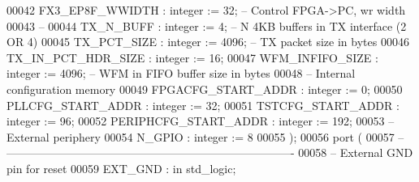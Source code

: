\begin{DoxyCode}
00042       \textcolor{vhdlchar}{FX3_EP8F_WWIDTH}         \textcolor{vhdlchar}{:} \textcolor{comment}{integer} \textcolor{vhdlchar}{:=} \textcolor{vhdllogic}{}\textcolor{vhdllogic}{32};\textcolor{keyword}{     -- Control FPGA->PC, wr width}
00043 \textcolor{keyword}{      -- }
00044       \textcolor{vhdlchar}{TX_N_BUFF}               \textcolor{vhdlchar}{:} \textcolor{comment}{integer} \textcolor{vhdlchar}{:=} \textcolor{vhdllogic}{}\textcolor{vhdllogic}{4};\textcolor{keyword}{      -- N 4KB buffers in TX interface (2 OR 4)}
00045       \textcolor{vhdlchar}{TX_PCT_SIZE}             \textcolor{vhdlchar}{:} \textcolor{comment}{integer} \textcolor{vhdlchar}{:=} \textcolor{vhdllogic}{}\textcolor{vhdllogic}{4096};\textcolor{keyword}{   -- TX packet size in bytes}
00046       \textcolor{vhdlchar}{TX_IN_PCT_HDR_SIZE}      \textcolor{vhdlchar}{:} \textcolor{comment}{integer} \textcolor{vhdlchar}{:=} \textcolor{vhdllogic}{}\textcolor{vhdllogic}{16};
00047       \textcolor{vhdlchar}{WFM_INFIFO_SIZE}         \textcolor{vhdlchar}{:} \textcolor{comment}{integer} \textcolor{vhdlchar}{:=} \textcolor{vhdllogic}{}\textcolor{vhdllogic}{4096};\textcolor{keyword}{   -- WFM in FIFO buffer size in bytes }
00048 \textcolor{keyword}{      -- Internal configuration memory }
00049       \textcolor{vhdlchar}{FPGACFG_START_ADDR}      \textcolor{vhdlchar}{:} \textcolor{comment}{integer} \textcolor{vhdlchar}{:=} \textcolor{vhdllogic}{}\textcolor{vhdllogic}{0};
00050       \textcolor{vhdlchar}{PLLCFG_START_ADDR}       \textcolor{vhdlchar}{:} \textcolor{comment}{integer} \textcolor{vhdlchar}{:=} \textcolor{vhdllogic}{}\textcolor{vhdllogic}{32};
00051       \textcolor{vhdlchar}{TSTCFG_START_ADDR}       \textcolor{vhdlchar}{:} \textcolor{comment}{integer} \textcolor{vhdlchar}{:=} \textcolor{vhdllogic}{}\textcolor{vhdllogic}{96};
00052       \textcolor{vhdlchar}{PERIPHCFG_START_ADDR}    \textcolor{vhdlchar}{:} \textcolor{comment}{integer} \textcolor{vhdlchar}{:=} \textcolor{vhdllogic}{}\textcolor{vhdllogic}{192};
00053 \textcolor{keyword}{      -- External periphery}
00054       \textcolor{vhdlchar}{N_GPIO}                  \textcolor{vhdlchar}{:} \textcolor{comment}{integer} \textcolor{vhdlchar}{:=} \textcolor{vhdllogic}{}\textcolor{vhdllogic}{8}
00055    \textcolor{vhdlchar}{)};
00056    \textcolor{keywordflow}{port} \textcolor{vhdlchar}{(}
00057 \textcolor{keyword}{      -- ----------------------------------------------------------------------------}
00058 \textcolor{keyword}{      -- External GND pin for reset}
00059       \textcolor{vhdlchar}{EXT_GND}           \textcolor{vhdlchar}{:} \textcolor{keywordflow}{in}     \textcolor{comment}{std\_logic};

\end{DoxyCode}

